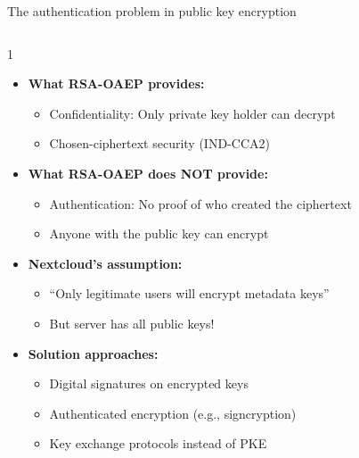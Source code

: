 \ifdefined\PRESENTATION\else\PassOptionsToClass{handout}{beamer}\fi\documentclass[aspectratio=169, lualatex]{beamer}
\begin{document}
\begin{frame}{The authentication problem in public key encryption}
	\begin{columns}[c]
		\begin{column}{1\textwidth}
			\begin{itemize}
				\item \textbf{What RSA-OAEP provides:}
				      \begin{itemize}
					      \item Confidentiality: Only private key holder can decrypt
					      \item Chosen-ciphertext security (IND-CCA2)
				      \end{itemize}
				\item \textbf{What RSA-OAEP does NOT provide:}
				      \begin{itemize}
					      \item Authentication: No proof of who created the ciphertext
					      \item Anyone with the public key can encrypt
				      \end{itemize}
				\item \textbf{Nextcloud's assumption:}
				      \begin{itemize}
					      \item ``Only legitimate users will encrypt metadata keys''
					      \item But server has all public keys!
				      \end{itemize}
				\item \textbf{Solution approaches:}
				      \begin{itemize}
					      \item Digital signatures on encrypted keys
					      \item Authenticated encryption (e.g., signcryption)
					      \item Key exchange protocols instead of PKE
				      \end{itemize}
			\end{itemize}
		\end{column}
	\end{columns}
\end{frame}
\end{document}

